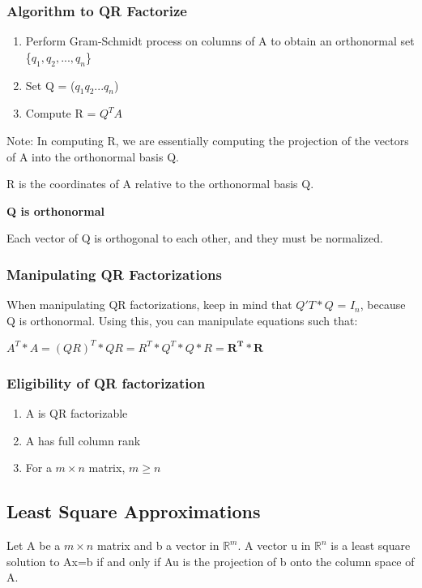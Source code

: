 \documentclass{article}
\newcommand{\sub}[1]{\vspace{10pt}\textbf{#1}}
\begin{document}
\subsubsection{Algorithm to QR Factorize}
\begin{enumerate}
    \item Perform Gram-Schmidt process on columns of A to obtain an orthonormal set \{$q_1,q_2,...,q_n$\}
    \item Set Q = ($q_1 q_2 ... q_n$)
    \item Compute R = $Q^TA$
\end{enumerate}

Note: In computing R, we are essentially computing the projection of the vectors of A into the orthonormal basis Q.

R is the coordinates of A relative to the orthonormal basis Q.

\sub{Q is orthonormal}

Each vector of Q is orthogonal to each other, and they must be normalized.

\subsubsection{Manipulating QR Factorizations}
When manipulating QR factorizations, keep in mind that $Q'T * Q$ = $I_n$, because Q is orthonormal. Using this, you can manipulate equations such that:
\begin{center}
    $A^T*A = (QR)^T * QR = R^T * Q^T * Q * R = \mathbf{R^T * R}$
\end{center}

\subsubsection{Eligibility of QR factorization}
\begin{enumerate}
    \item A is QR factorizable
    \item A has full column rank
    \item For a $m \times n$ matrix, $m \geq n$
\end{enumerate}


\subsection{Least Square Approximations}
Let A be a $m \times n$ matrix and b a vector in $\mathbb{R}^m$. A vector u in $\mathbb{R}^n$ is a least square solution to Ax=b if and only if Au is the projection of b onto the column space of A.
\end{document}
